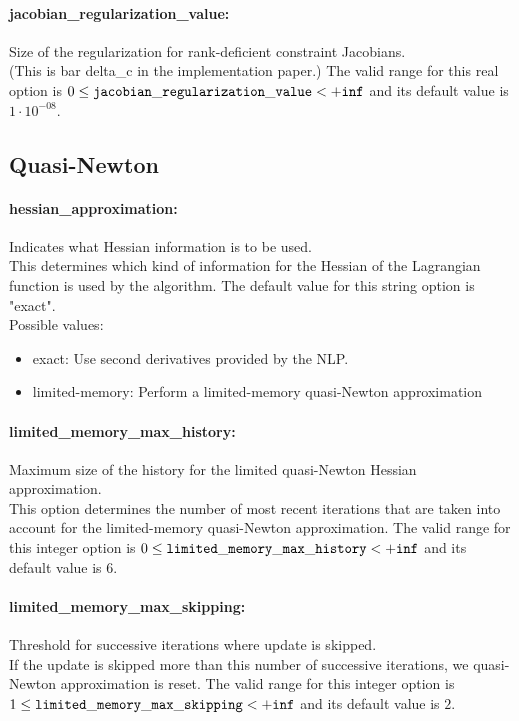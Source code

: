 \paragraph{jacobian\_regularization\_value:}\label{sec:jacobian_regularization_value} Size of the regularization for rank-deficient constraint Jacobians. $\;$ \\
 (This is bar delta\_c in the implementation
paper.) The valid range for this real option is 
$0 \le {\tt jacobian\_regularization\_value } <  {\tt +inf}$
and its default value is $1 \cdot 10^{-08}$.


\subsection{Quasi-Newton}

\paragraph{hessian\_approximation:}\label{sec:hessian_approximation} Indicates what Hessian information is to be used. $\;$ \\
 This determines which kind of information for the
Hessian of the Lagrangian function is used by the
algorithm.
The default value for this string option is "exact".
\\ 
Possible values:
\begin{itemize}
   \item exact: Use second derivatives provided by the NLP.
   \item limited-memory: Perform a limited-memory quasi-Newton
approximation
\end{itemize}

\paragraph{limited\_memory\_max\_history:}\label{sec:limited_memory_max_history} Maximum size of the history for the limited quasi-Newton Hessian approximation. $\;$ \\
 This option determines the number of most recent
iterations that are taken into account for the
limited-memory quasi-Newton approximation. The valid range for this integer option is
$0 \le {\tt limited\_memory\_max\_history } <  {\tt +inf}$
and its default value is $6$.


\paragraph{limited\_memory\_max\_skipping:}\label{sec:limited_memory_max_skipping} Threshold for successive iterations where update is skipped. $\;$ \\
 If the update is skipped more than this number of
successive iterations, we quasi-Newton
approximation is reset. The valid range for this integer option is
$1 \le {\tt limited\_memory\_max\_skipping } <  {\tt +inf}$
and its default value is $2$.


